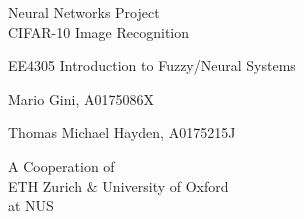     \begin{titlepage}

    \begin{center}
    \vspace*{6cm}
    \centering
    \Huge
    {
    	Neural Networks Project\\
    	CIFAR-10 Image Recognition }
    \vspace{2cm}

    \Huge
    {EE4305 Introduction to Fuzzy/Neural Systems}
    \vspace{0.5cm}

    \Large
    {Mario Gini, A0175086X

    Thomas Michael Hayden, A0175215J\\
	}
	\vspace{1cm}
	\Large
	{
		A Cooperation of\\
		ETH Zurich \& University of Oxford\\
		at NUS}

    \end{center}
    \end{titlepage}
